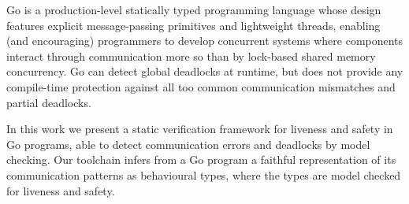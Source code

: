 Go is a production-level statically typed programming language whose design features explicit message-passing primitives and lightweight threads, enabling (and encouraging) programmers to develop concurrent systems where components interact through communication more so than by lock-based shared memory concurrency. Go can detect global deadlocks at runtime, but does not provide any compile-time protection against all too common communication mismatches and partial deadlocks.

In this work we present a static verification framework for liveness and safety in Go programs, able to detect communication errors and deadlocks by model checking. Our toolchain infers from a Go program a faithful representation of its communication patterns as behavioural types, where the types are model checked for liveness and safety.
